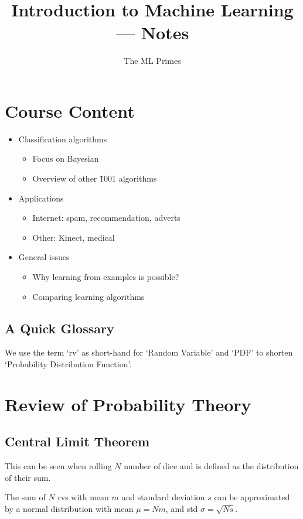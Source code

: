 \documentclass{article}
\title{Introduction to Machine Learning --- Notes}
\author{The ML Primes}
\newenvironment{definition}[1][Definition]{\begin{trivlist}
\item[\hskip \labelsep {\bfseries #1}]}{\end{trivlist}}
\begin{document}
\maketitle

\setcounter{section}{-1}
\section{Course Content}
\begin{itemize}
    \item Classification algorithms
    \begin{itemize}
        \item Focus on Bayesian
        \item Overview of other \~1001 algorithms
    \end{itemize}
    \item Applications 
    \begin{itemize}
        \item Internet: spam, recommendation, adverts
        \item Other: Kinect, medical
    \end{itemize}
    \item General issues
    \begin{itemize}
        \item Why learning from examples is possible?
        \item Comparing learning algorithms
    \end{itemize}
\end{itemize}

    \subsection{A Quick Glossary}
        We use the term `rv' as short-hand for `Random Variable' and `PDF' to shorten `Probability Distribution Function'.

\section{Review of Probability Theory}
    \subsection{Central Limit Theorem}
        This can be seen when rolling $N$ number of dice and is defined as the distribution of their sum.
        \begin{definition}
        The sum of $N$ rvs with mean $m$ and standard deviation $s$ can be approximated by a normal distribution with mean $\mu=Nm$, and std $\sigma=\sqrt{Ns}$.
        \end{definition}
        
\end{document}
